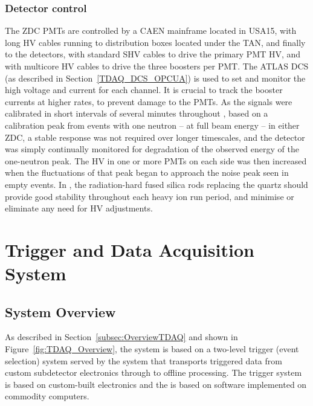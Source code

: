 \documentclass[cernpreprint, atlasdraft=false, UKenglish,british,orcidlogo, texmf, orcidlogo]{atlasdoc}
\begin{document}
\subsubsection{ Detector control}
The \gls{ZDC} \glspl{PMT} are controlled by a CAEN mainframe
located in \gls{USA15}, with long \gls{HV} cables running to distribution
boxes located under the \gls{TAN}, and finally to the detectors, with
standard \gls{SHV} cables to drive the primary \gls{PMT} \gls{HV}, and with multicore
\gls{HV} cables to drive the three boosters per \gls{PMT}.  The ATLAS \gls{DCS} (as described in Section~\ref{TDAQ_DCS_OPCUA}) is used
to set and monitor the high voltage and current for each channel.
It is crucial to track the booster currents at higher rates,
to prevent damage to the \glspl{PMT}.
As the signals were calibrated in short intervals of several minutes throughout \RunTwo, based on a calibration
peak from events with one neutron -- at full beam energy -- in either
\gls{ZDC}, a stable response was not required over longer timescales, and the \RunTwo detector was simply continually monitored for degradation
of the observed energy of the one-neutron peak.  The \gls{HV} in one or
more \glspl{PMT} on each side was then increased when the fluctuations of that peak
began to approach the noise peak seen in empty events.  In \RunThr, the
radiation-hard fused silica rods replacing the quartz should
provide good stability throughout each heavy ion run period, and
minimise or eliminate any need for \gls{HV} adjustments.


 
 


\clearpage
\newpage
 
\section{Trigger and Data Acquisition System} 
\label{sec:TDAQ}
 

 
\subsection{System Overview}
As described in Section~\ref{subsec:OverviewTDAQ} and shown in Figure~\ref{fig:TDAQ_Overview}, the  system is based on a two-level trigger (event selection) system served by  the  system that transports triggered data from custom subdetector electronics through to offline processing. The  trigger system is based on custom-built electronics  and the   is based on software implemented on commodity computers.
 
\end{document}
